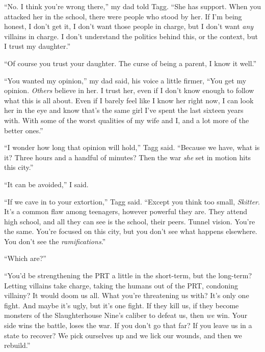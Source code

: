 ``No.  I think you're wrong there,'' my dad told Tagg.  ``She has support.  When you attacked her in the school, there were people who stood by her.  If I'm being honest, I don't get it, I don't want those people in charge, but I don't want \emph{any} villains in charge.  I don't understand the politics behind this, or the context, but I trust my daughter.''



``Of course you trust your daughter.  The curse of being a parent, I know it well.''



``You wanted my opinion,'' my dad said, his voice a little firmer, ``You get my opinion.  \emph{Others} believe in her.  I trust her, even if I don't know enough to follow what this is all about. Even if I barely feel like I know her right now, I can look her in the eye and know that's the same girl I've spent the last sixteen years with.  With some of the worst qualities of my wife and I, and a lot more of the better ones.''



``I wonder how long that opinion will hold,'' Tagg said.  ``Because we have, what is it?  Three hours and a handful of minutes?  Then the war \emph{she} set in motion hits this city.''



``It can be avoided,'' I said.



``If we cave in to your extortion,'' Tagg said.  ``Except you think too small, \emph{Skitter}.  It's a common flaw among teenagers, however powerful they are.  They attend high school, and all they can see is the school, their peers.  Tunnel vision.  You're the same.  You're focused on this city, but you don't see what happens elsewhere.  You don't see the \emph{ramifications}.''



``Which are?''



``You'd be strengthening the PRT a little in the short-term, but the long-term?  Letting villains take charge, taking the humans out of the PRT, condoning villainy?  It would doom us all.  What you're threatening us with?  It's only one fight.  And maybe it's ugly, but it's one fight.  If they kill us, if they become monsters of the Slaughterhouse Nine's caliber to defeat us, then \emph{we} win.  Your side wins the battle, loses the war.  If you don't go that far?  If you leave us in a state to recover?  We pick ourselves up and we lick our wounds, and then we rebuild.''



